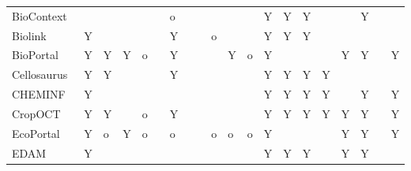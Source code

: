 \begin{table}
\begin{tabular}{llllllllllllllllllll}
           BioContext~\cite{biocontext} &                &          &       &            &            &        o &                &               &         &         &         &                          Y &         Y &                 Y &                    &               &               Y &                &               \\
                Biolink~\cite{Unni2022} &              Y &          &       &            &            &        Y &                &               &       o &         &         &                          Y &         Y &                 Y &                    &               &                 &                &               \\
           BioPortal~\cite{Whetzel2011} &              Y &        Y &     Y &          o &            &        Y &                &               &         &       Y &       o &                          Y &           &                   &                    &             Y &               Y &                &             Y \\
         Cellosaurus~\cite{Bairoch2018} &              Y &        Y &       &            &            &        Y &                &               &         &         &         &                          Y &         Y &                 Y &                  Y &               &                 &                &               \\
            CHEMINF~\cite{Hastings2011} &              Y &          &       &            &            &          &                &               &         &         &         &                          Y &         Y &                 Y &                  Y &               &               Y &                &             Y \\
              CropOCT~\cite{Arnaud2020} &              Y &        Y &       &          o &            &        Y &                &               &         &         &         &                          Y &         Y &                 Y &                  Y &             Y &               Y &                &             Y \\
      EcoPortal~\cite{Kechagioglou2021} &              Y &        o &     Y &          o &            &        o &                &               &       o &       o &       o &                          Y &           &                   &                    &             Y &               Y &                &             Y \\
                                   EDAM &              Y &          &       &            &            &          &                &               &         &         &         &                          Y &         Y &                 Y &                    &             Y &               Y &                &               \\

\end{tabular}
\end{table}
